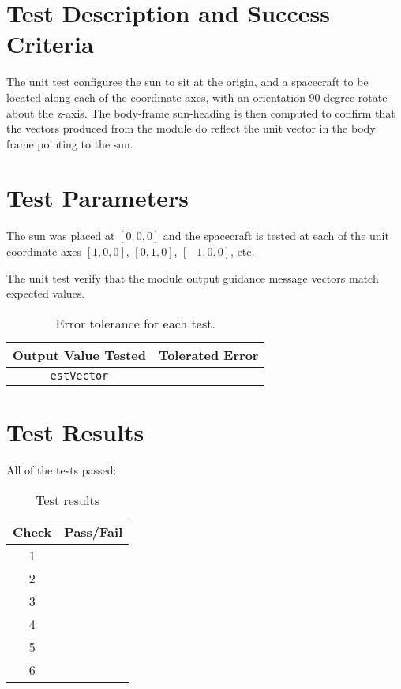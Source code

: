 
\section{Test Description and Success Criteria}
The unit test configures the sun to sit at the origin, and a spacecraft to be located along each of the coordinate axes, with an orientation 90 degree rotate about the z-axis. The body-frame sun-heading is then computed to confirm that the vectors produced from the module do reflect the unit vector in the body frame pointing to the sun. 


\section{Test Parameters}

The sun was placed at $[0, 0, 0]$ and the spacecraft is tested at each of the unit coordinate axes $[1, 0, 0]$, $[0, 1, 0]$, $[-1, 0, 0]$, etc. 

The unit test verify that the module output guidance message vectors match expected values.
\begin{table}[htbp]
	\caption{Error tolerance for each test.}
	\label{tab:errortol}
	\centering \fontsize{10}{10}\selectfont
	\begin{tabular}{ c | c } %
		\hline\hline
		\textbf{Output Value Tested}  & \textbf{Tolerated Error}  \\ 
		\hline
		{\tt estVector}        & 	   \\ 
		\hline\hline
	\end{tabular}
\end{table}




\section{Test Results}


All of the tests passed:
\begin{table}[H]
	\caption{Test results}
	\label{tab:results}
	\centering \fontsize{10}{10}\selectfont
	\begin{tabular}{c | c  } %
		\hline\hline
		\textbf{Check} 						  		&\textbf{Pass/Fail} \\ 
		\hline
	   1	   			&  \\ 
	   2	   			&  \\ 
	   3	   			&  \\ 
	   4	   			&  \\ 
	   5	   			&  \\ 
	   6	   			&  \\ 
	   \hline\hline
	\end{tabular}
\end{table}




